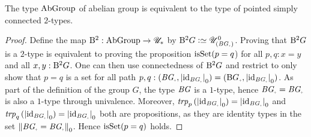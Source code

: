 \begin{theorem}
  The type $\mathrm{AbGroup}$ of abelian group is equivalent to the type
  of pointed simply connected $2$-types.
\end{theorem}
\begin{proof}%
  \newcommand{\loopspace}[1][]{\constructor{Aut}^2_{#1}}
  Define the map $\mathrm{B}^2 : \mathrm{AbGroup} \to {\mathscr{U}_*}$ by
  $\BB G\defequi \univcover{\UU}{\BG_\div}$. Proving that $\mathrm{B}^2 G$ is a
  $2$-type is equivalent to proving the proposition $\isset(p=q$) for
  all $p,q:x=y$ and all $x,y:\mathrm{B}^2 G$. One can then use connectedness of
  $\mathrm{B}^2 G$ and restrict to only show that $p=q$ is a set for all path
  $p,q:(\BG_\div,\settrunc{\id_{\BG_\div}})=({\B
    G}_\div,\settrunc{\id_{\BG_\div}})$. As part of the definition
  of the group $G$, the type $\mathit{B}\mathit{G}$ is a $1$-type, hence
  $\BG_\div=\BG_\div$ is also a $1$-type through
  univalence. Moreover,
  $\trp p {(\settrunc{\id_{\BG_\div}})} = \settrunc{\id_{\BG_\div}}$ and
  $\trp q {(\settrunc{\id_{\BG_\div}})} = \settrunc{\id_{\BG_\div}}$ both
  are propositions, as they are identity types in the set
  $\setTrunc{\BG_\div=\BG_\div}$. Hence $\isset(p=q)$ holds.


\end{proof}
